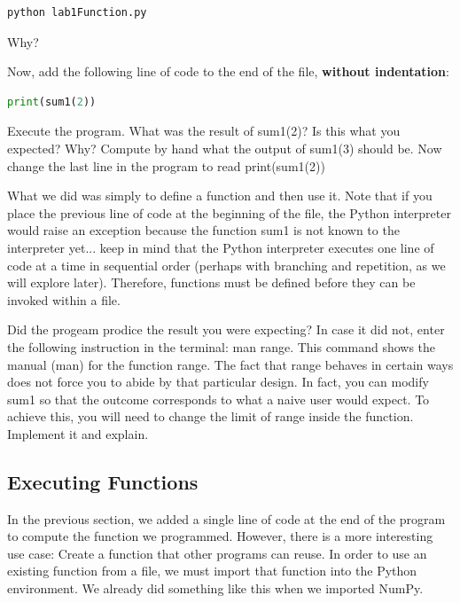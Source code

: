\begin{lstlisting}[language=Python]
	python lab1Function.py
\end{lstlisting}

Why? \QA 

Now, add the following line of code to the end of the file, \textbf{without indentation}: 

\begin{lstlisting}[language=Python]
print(sum1(2))
\end{lstlisting}

Execute the program. What was the result of {\s sum1(2)}? Is this what you expected? Why? \QA Compute by hand what the output of {\s sum1(3)} should be. Now change the last line in the program to read {\s print(sum1(2))} 

What we did was simply to define a function and then use it. Note that if you place the previous line of code at the beginning of the file, the Python interpreter would raise an exception because the function {\s sum1} is not known to the interpreter yet... keep in mind that the Python interpreter executes one line of code at a time in sequential order (perhaps with branching and repetition, as we will explore later). Therefore, functions must be defined before they can be invoked within a file. 

Did the progeam {\s } prodice the result you were expecting? In case it did not, enter the following instruction in the terminal: {\s man range}. This command shows the manual ({\s man}) for the function {\s range}.  The fact that {\s range} behaves in certain ways does not force you to abide by that particular design. In fact, you can modify {\s sum1} so that the outcome corresponds to what a naive user would expect. To achieve this, you will need to change the limit of range inside the function. Implement it and explain. \QA

\subsection{Executing Functions}

In the previous section, we added a single line of code at the end of the program to compute the function we programmed. However, there is a more interesting use case: Create a function that other programs can reuse. In order to use an existing function from a file, we must import that function into the Python environment. We already did something like this when we imported NumPy. 

